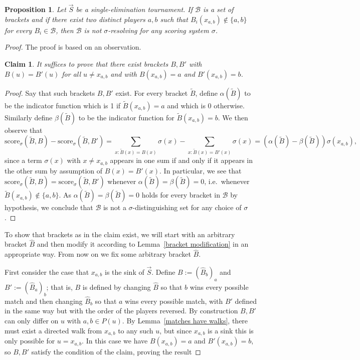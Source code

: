 \documentclass[12pt,letterpaper]{article}
\newtheorem{prop}[thm]{Proposition}
\newtheorem{claim}[thm]{Claim}
\theoremstyle{definition}
\newcommand{\al}{\alpha}
\newcommand{\be}{\beta}
\newcommand{\sig}{\sigma}
\renewcommand{\1}{\mathbbm{1}}
\renewcommand{\c}[1]{\mathcal{#1}}
\newcommand{\score}{\mathrm{score}}
\newcommand{\tour}{\vec{S}}
\begin{document}
\begin{prop}\label{necessary condition}
	Let $\tour$ be a single-elimination tournament. If $\c{B}$ is a set of brackets and if there exist two distinct players $a,b$ such that $B_i(x_{a,b})\notin \{a,b\}$ for every $B_i\in \c{B}$, then $\c{B}$ is not $\sig$-resolving for any scoring system $\sig$.
\end{prop}
\begin{proof}
	The proof is based on an observation.
	\begin{claim}
		It suffices to prove that there exist brackets $B,B'$ with $B(u)=B'(u)$ for all $u\ne x_{a,b}$ and with $B(x_{a,b})=a$ and $B'(x_{a,b})=b$.
	\end{claim}
	\begin{proof}
		Say that such brackets $B,B'$ exist.  For every bracket $\widetilde{B}$, define $\al(\widetilde{B})$ to be the indicator function which is 1 if $\widetilde{B}(x_{a,b})=a$ and which is 0 otherwise.  Similarly define $\be(\widetilde{B})$ to be the indicator function for $\widetilde{B}(x_{a,b})=b$.  We then observe that
		\[\score_\sig(\widetilde{B},B)-\score_\sig(\widetilde{B},B')=\sum_{x:\widetilde{B}(x)=B(x)}\sig(x)-\sum_{x:\widetilde{B}(x)=B'(x)}\sig(x)=(\al(\widetilde{B})-\be(\widetilde{B}))\sig(x_{a,b}),\]
		since a term $\sig(x)$ with $x\ne x_{a,b}$ appears in one sum if and only if it appears in the other sum by assumption of $B(x)=B'(x)$.  In particular, we see that $\score_\sig(\widetilde{B},B)=\score_\sig(\widetilde{B},B')$ whenever $\al(\widetilde{B})=\be(\widetilde{B})=0$, i.e.\ whenever $\widetilde{B}(x_{a,b})\notin \{a,b\}$.  As $\al(\widetilde{B})=\be(\widetilde{B})=0$ holds for every bracket in $\c{B}$ by hypothesis, we conclude that $\c{B}$ is not a $\sig$-distinguishing set for any choice of $\sig$.
	\end{proof}
	
	To show that brackets as in the claim exist, we will start with an arbitrary bracket  $\widehat{B}$ and then modify it according to Lemma~\ref{bracket modification} in an appropriate way.  From now on we fix some arbitrary bracket $\widehat{B}$.
	
	First consider the case that $x_{a,b}$ is the sink of $\tour$.  Define $B:=(\widehat{B}_b)_a$ and $B':=(\widehat{B}_a)_b$; that is, $B$ is defined by changing $\widehat{B}$ so that $b$ wins every possible match and then changing $\widehat{B}_b$ so that $a$ wins every possible match, with $B'$ defined in the same way but with the order of the players reversed.  By construction $B,B'$ can only differ on $u$ with $a,b\in P(u)$.  By Lemma~\ref{matches have walks}, there must exist a directed walk from $x_{a,b}$ to any such $u$, but since $x_{a,b}$ is a sink this is only possible for $u=x_{a,b}$.  In this case we have $B(x_{a,b})=a$ and $B'(x_{a,b})=b$, so $B,B'$ satisfy the condition of the claim, proving the result
	

\end{proof}
\end{document}
